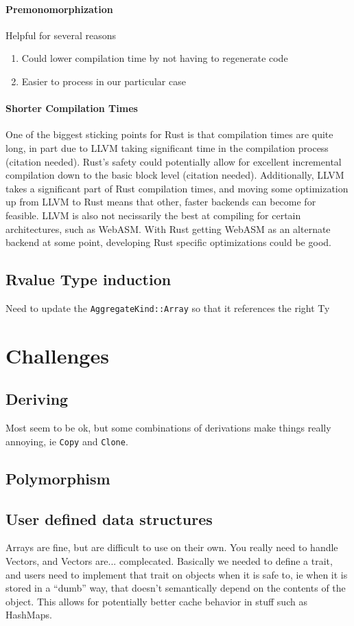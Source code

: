\documentclass[12pt,final]{article}
\begin{document}
\paragraph{Premonomorphization} Helpful for several reasons
\begin{enumerate}
\item Could lower compilation time by not having to regenerate code
\item  Easier to process in our particular case
\end{enumerate}

\paragraph{Shorter Compilation Times} One of the biggest sticking points for
Rust is that compilation times are quite long, in part due to LLVM taking
significant time in the compilation process (citation needed). Rust's safety
could potentially allow for excellent incremental compilation down to the basic
block level (citation needed). Additionally, LLVM takes a significant part of
Rust compilation times, and moving some optimization up from LLVM to Rust means
that other, faster backends can become for feasible. LLVM is also not
necissarily the best at compiling for certain architectures, such as WebASM.
With Rust getting WebASM as an alternate backend at some point, developing Rust
specific optimizations could be good.


\subsection{Rvalue Type induction}
Need to update the \texttt{AggregateKind::Array} so that it references the right Ty

\section{Challenges}
\label{sec:annoying}

\subsection{Deriving}
Most seem to be ok, but some combinations of derivations make things really
annoying, ie \texttt{Copy} and \texttt{Clone}.

\subsection{Polymorphism}

\subsection{User defined data structures}
Arrays are fine, but are difficult to use on their own. You really need to
handle Vectors, and Vectors are... complecated. Basically we needed to define a
trait, and users need to implement that trait on objects when it is safe to, ie
when it is stored in a ``dumb'' way, that doesn't semantically depend on the
contents of the object. This allows for potentially better cache behavior in
stuff such as HashMaps.
\end{document}
